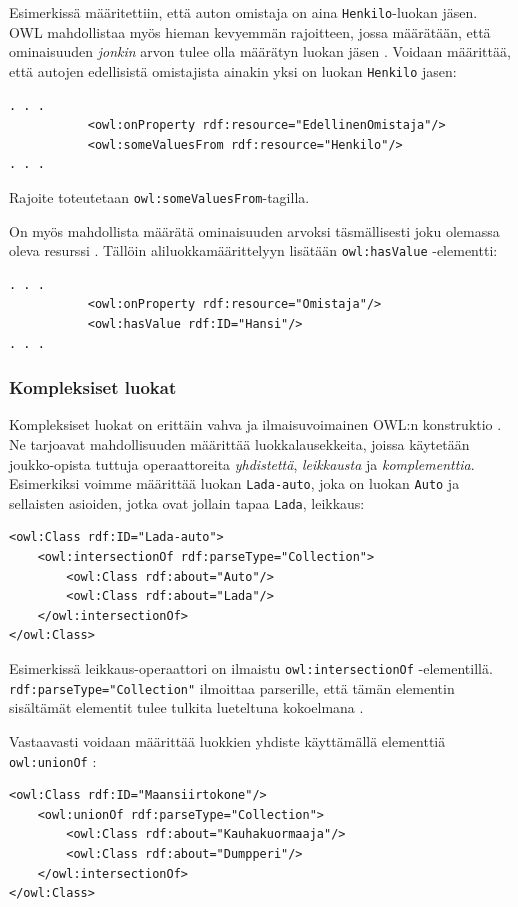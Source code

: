 \documentclass[finnish]{tktltiki2}
\theoremstyle{definition}
\theoremstyle{remark}
\begin{document}
Esimerkissä määritettiin, että auton omistaja on aina \texttt{Henkilo}-luokan jäsen. OWL mahdollistaa myös hieman kevyemmän rajoitteen, jossa määrätään, että ominaisuuden \textit{jonkin} arvon tulee olla määrätyn luokan jäsen \cite{SWM04}. Voidaan määrittää, että autojen edellisistä omistajista ainakin yksi on luokan \texttt{Henkilo} jasen:
\begin{verbatim}
. . .
           <owl:onProperty rdf:resource="EdellinenOmistaja"/>
           <owl:someValuesFrom rdf:resource="Henkilo"/>
. . .

\end{verbatim}
Rajoite toteutetaan \texttt{owl:someValuesFrom}-tagilla.

On myös mahdollista määrätä ominaisuuden arvoksi täsmällisesti joku olemassa oleva resurssi \cite{SWM04}. Tällöin aliluokkamäärittelyyn lisätään \texttt{owl:hasValue} -elementti:
\begin{verbatim}
. . .
           <owl:onProperty rdf:resource="Omistaja"/>
           <owl:hasValue rdf:ID="Hansi"/>
. . .
\end{verbatim}

\subsubsection{Kompleksiset luokat}
Kompleksiset luokat on erittäin vahva ja ilmaisuvoimainen OWL:n konstruktio \cite{SWM04}. Ne tarjoavat mahdollisuuden määrittää luokkalausekkeita, joissa käytetään joukko-opista tuttuja operaattoreita \textit{yhdistettä}, \textit{leikkausta} ja \textit{komplementtia}. Esimerkiksi voimme määrittää luokan \texttt{Lada-auto}, joka on luokan \texttt{Auto} ja sellaisten asioiden, jotka ovat jollain tapaa \texttt{Lada}, leikkaus:
\begin{verbatim}
<owl:Class rdf:ID="Lada-auto">
    <owl:intersectionOf rdf:parseType="Collection">
        <owl:Class rdf:about="Auto"/>
        <owl:Class rdf:about="Lada"/>
    </owl:intersectionOf>
</owl:Class>
\end{verbatim}

Esimerkissä leikkaus-operaattori on ilmaistu \texttt{owl:intersectionOf} -elementillä. \texttt{rdf:parseType="Collection"} ilmoittaa parserille, että tämän elementin sisältämät elementit tulee tulkita lueteltuna kokoelmana \cite{SWM04}.

Vastaavasti voidaan määrittää luokkien yhdiste käyttämällä elementtiä \texttt{owl:unionOf} \cite{SWM04}:
\begin{verbatim}
<owl:Class rdf:ID="Maansiirtokone"/>
    <owl:unionOf rdf:parseType="Collection">
        <owl:Class rdf:about="Kauhakuormaaja"/>
        <owl:Class rdf:about="Dumpperi"/>
    </owl:intersectionOf>
</owl:Class>
\end{verbatim}
 
\end{document}
